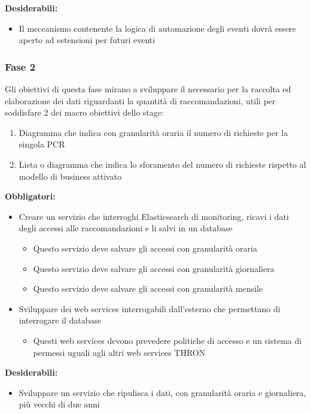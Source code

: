 \documentclass[a4paper, 12pt, twoside, openright]{book}
\begin{document}
\textbf{Desiderabili:}
\begin{itemize}
\item Il meccanismo contenente la logica di automazione degli eventi dovrà essere aperto ad estensioni per futuri eventi
\end{itemize}

\subsubsection{Fase 2}
Gli obiettivi di questa fase mirano a sviluppare il necessario per la raccolta ed elaborazione dei dati riguardanti la quantità di raccomandazioni, utili per soddisfare 2 dei macro obiettivi dello stage:
\begin{enumerate}
	\item Diagramma che indica con granularità oraria il numero di richieste per la singola PCR
	\item Lista o diagramma che indica lo sforamento del numero di richieste rispetto al modello di business attivato
\end{enumerate}

\textbf{Obbligatori:}
\begin{itemize}
	\item Creare un servizio che interroghi Elasticsearch di monitoring, ricavi i dati degli accessi alle raccomandazioni e li salvi in un database
	\begin{itemize}
		\item Questo servizio deve salvare gli accessi con granularità oraria
		\item Questo servizio deve salvare gli accessi con granularità giornaliera
		\item Questo servizio deve salvare gli accessi con granularità mensile
	\end{itemize}
	\item Sviluppare dei web services interrogabili dall'esterno che permettano di interrogare il database
	\begin{itemize}
		\item Questi web services devono prevedere politiche di accesso e un sistema di permessi uguali agli altri web services THRON
	\end{itemize}
\end{itemize}
\textbf{Desiderabili:}
\begin{itemize}
	\item Sviluppare un servizio che ripulisca i dati, con granularità oraria e giornaliera, più vecchi di due anni
\end{itemize}
\end{document}
